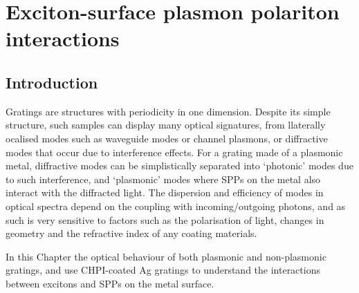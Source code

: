
\chapter{Exciton-surface plasmon polariton interactions}

\graphicspath{{Chapter7/Figures/}}

\section{Introduction}
Gratings are structures with periodicity in one dimension. Despite its simple structure, such samples can display many optical signatures, from llaterally ocalised modes such as waveguide modes or channel plasmons, or diffractive modes that occur due to interference effects. For a grating made of a plasmonic metal, diffractive modes can be simplistically separated into `photonic' modes due to such interference, and `plasmonic' modes where SPPs on the metal also interact with the diffracted light. The dispersion and efficiency of modes in optical spectra depend on the coupling with incoming/outgoing photons, and as such is very sensitive to factors such as the polarisation of light, changes in geometry and the refractive index of any coating materials.

In this Chapter the optical behaviour of both plasmonic and non-plasmonic gratings, and use CHPI-coated Ag gratings to understand the interactions between excitons and SPPs on the metal surface.


